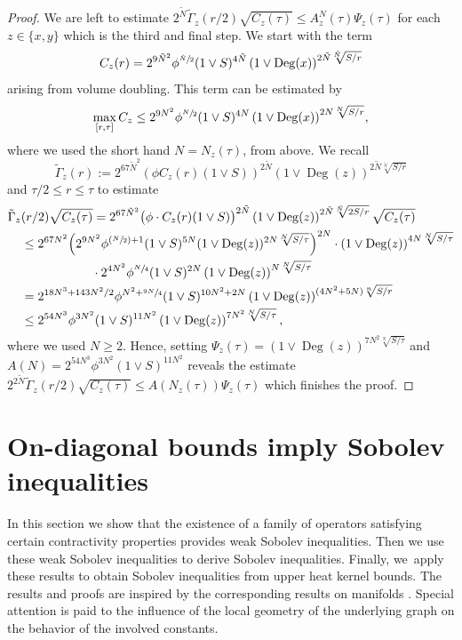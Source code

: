 \documentclass[10pt]{amsart}
\newcommand{\Psfrac}[2]{(\sfrac{#1}{#2})}
\theoremstyle{plain}
\theoremstyle{definition}
\DeclareMathOperator{\Deg}{Deg}
\begin{document}
\begin{proof}
We are left to estimate $ 2^{{\tilde N} }\tilde \Gamma_{z}(r/2) \sqrt{C_{z}(\tau)}\leq A^{N}_{z}(\tau)\Psi_{z}(\tau) $ for each $ z\in \{x,y\} $ which is the third and final step.
We start with the term
\[
C_z(r)=2^{9 \tilde N^2}\phi^{\sfrac{\tilde N}{2}}(1\vee S)^{4\tilde N}\left(1\vee\Deg(x)\right)^{2\tilde N\sqrt[\tilde N]{S/r}}
\]
arising from volume doubling. This term can be estimated by
\begin{align*}
\max_{[r,\tau]}C_{z} \leq {2^{9 N^2}\phi^{\sfrac{N}{2}}(1\vee S)^{4N}\left(1\vee\Deg(x)\right)^{2N\sqrt[N]{S/r}}},
\end{align*}
where we used the short hand $ N=N_{z}(\tau) $, from above. We
recall
\[
\tilde\Gamma_z(r)
:=
2^{67\tilde N^2}(\phi C_{z}(r)(1\vee S))^{2\tilde N}
\left(1\vee\Deg(z)
\right)
^{2\tilde N\sqrt[\tilde N]{{S}/{r}}}
\]
and $\tau/2\leq r\leq \tau$ to estimate
\begin{align*}
\tilde \Gamma_{z}&(r/2)\sqrt{C_{z}(\tau)}
=2^{67\tilde N^2}\big(\phi\cdot C_{z}(r)(1\vee S)\big)^{2\tilde N}
\left(1\vee\Deg(z)\right)^{2\tilde N\sqrt[\tilde N]{2{S}/{r}}} \sqrt{C_{z}(\tau)}
\\
&\leq 2^{67 N^2}\Bigl(2^{9 N^2} \phi^{\Psfrac{N}{2}+1}(1\vee S)^{5N}(1\vee\Deg(z))^{2N\sqrt[N]{S/\tau}} \Bigr)^{2 N}
\cdot\left(1\vee\Deg(z)\right)^{4N\sqrt[ N]{{S}/\tau}}
\\ &\hspace*{2cm} \cdot 2^{4 N^2}\phi^{\sfrac N4}(1\vee S)^{2N}\left(1\vee\Deg(z)\right)^{N\sqrt[N]{S/\tau}}
\\
&=
2^{18N^3+143 N^2/2}\phi^{N^{2}+\sfrac{9N}{4}} (1\vee S)^{10N^2+2N} \left(1\vee \Deg(z)\right)^{(4N^2+5N)\sqrt[n]{S/r}}\\
& \leq 2^{54 N^{3}}\phi^{3N^{2}}(1\vee S)^{11N^2}\left(1\vee \Deg(z)
\right)^{7N^2\sqrt[N]{S/\tau}},
\end{align*}
where we used $ N\ge 2 $. Hence, setting $ \Psi_z(\tau)=\left(1\vee \Deg(z)
\right)^{7N^2\sqrt[N]{S/\tau}}$
and $ A(N)=2^{54N^3}\phi
^{3N^2}(1\vee {S})^{11N^2} $
reveals the estimate {$ 2^{2{\tilde N}}\tilde \Gamma_{z}(r/2)\sqrt{C_{z}(\tau)} \leq A(N_{z}(\tau))\Psi_{z}(\tau)$} which finishes the proof.
\end{proof}

\section{On-diagonal bounds imply Sobolev inequalities}\label{section:heatsob}

{In this section} we show that the existence of a family of operators satisfying certain contractivity properties provides weak Sobolev inequalities. Then we use these weak Sobolev inequalities to derive Sobolev inequalities. Finally, we~apply these results to obtain Sobolev inequalities from upper heat kernel bounds. The results and proofs are inspired by the corresponding results on manifolds \cite{SaloffC-01,Varopoulos-85}. Special attention is paid to the influence of the local geometry of the underlying graph on the behavior of the involved constants.
\end{document}
